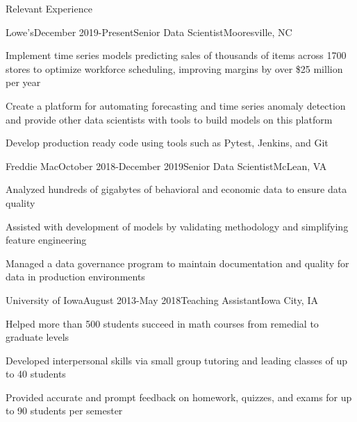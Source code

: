 \documentclass[hidelinks]{resume} %
\begin{document}
\begin{rSection}{Relevant Experience}

\begin{rSubsection}{Lowe's}{December 2019-Present}{Senior Data Scientist}{Mooresville, NC}
\item Implement time series models predicting sales of thousands of items across 1700 stores to optimize workforce scheduling, improving margins by over \$25 million per year
\item Create a platform for automating forecasting and time series anomaly detection and provide other data scientists with tools to build models on this platform
\item Develop production ready code using tools such as Pytest, Jenkins, and Git
\end{rSubsection}

\begin{rSubsection}{Freddie Mac}{October 2018-December 2019}{Senior Data Scientist}{McLean, VA}
\item Analyzed hundreds of gigabytes of behavioral and economic data to ensure data quality
\item Assisted with development of models by validating methodology and simplifying feature engineering
\item Managed a data governance program to maintain documentation and quality for data in production environments
\end{rSubsection}


\begin{rSubsection}{University of Iowa}{August 2013-May 2018}{Teaching Assistant}{Iowa City, IA}
\item Helped more than 500 students succeed in math courses from remedial to graduate levels
\item Developed interpersonal skills via small group tutoring and leading classes of up to 40 students
\item Provided accurate and prompt feedback on homework, quizzes, and exams for up to 90 students per semester
\end{rSubsection}


\end{rSection}
\end{document}
